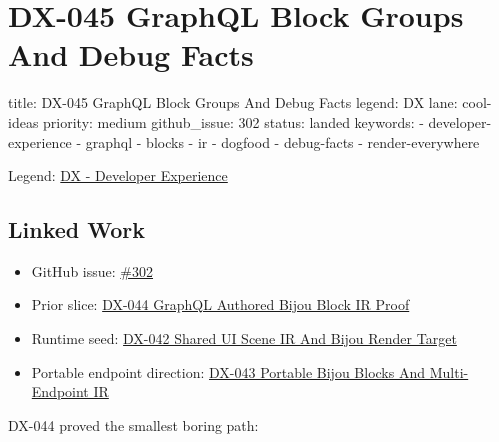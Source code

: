\chapter{DX-045 GraphQL Block Groups And Debug Facts}\label{record-141}

\smallskip

\begin{RecordMeta}
title: DX-045 GraphQL Block Groups And Debug Facts
legend: DX
lane: cool-ideas
priority: medium
github_issue: 302
status: landed
keywords:
  - developer-experience
  - graphql
  - blocks
  - ir
  - dogfood
  - debug-facts
  - render-everywhere

\end{RecordMeta}

Legend: \href{https://github.com/flyingrobots/bijou/blob/1853ad902f6bf219326409e7f743a5a1d6517dbc/docs/legends/DX-developer-experience.md}{DX - Developer Experience}

\section{Linked Work}\label{record-141-linked-work}

\begin{itemize}
\tightlist
\item
  GitHub issue: \href{https://github.com/flyingrobots/bijou/issues/302}{\#302}
\item
  Prior slice: \href{https://github.com/flyingrobots/bijou/blob/cbd70612140e7a450d764b3c7be1c6af878b99bc/docs/design/DX-044-graphql-authored-bijou-block-ir-proof.md}{DX-044 GraphQL Authored Bijou Block IR Proof}
\item
  Runtime seed: \href{https://github.com/flyingrobots/bijou/blob/cbd70612140e7a450d764b3c7be1c6af878b99bc/docs/design/DX-042-shared-ui-scene-ir-and-bijou-render-target.md}{DX-042 Shared UI Scene IR And Bijou Render Target}
\item
  Portable endpoint direction: \href{https://github.com/flyingrobots/bijou/blob/cbd70612140e7a450d764b3c7be1c6af878b99bc/docs/design/DX-043-portable-bijou-blocks-and-multi-endpoint-ir.md}{DX-043 Portable Bijou Blocks And Multi-Endpoint IR}
\end{itemize}

DX-044 proved the smallest boring path:



